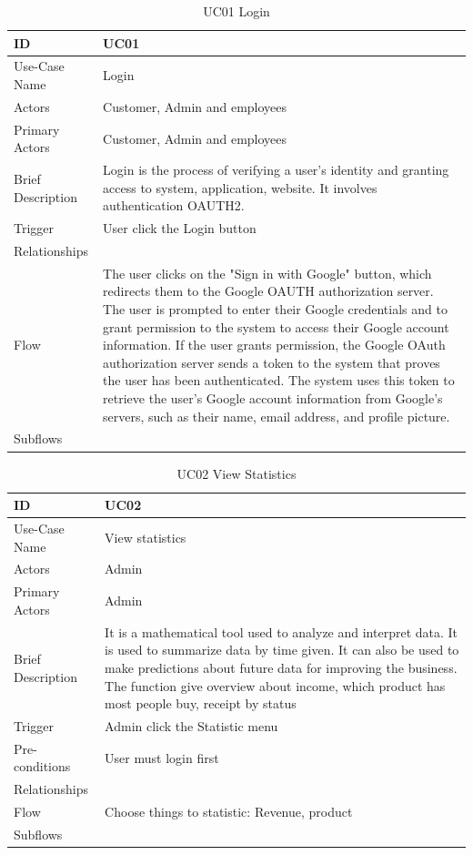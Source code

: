 \begin{table}
\begin{tabular}{|>{\raggedright\arraybackslash}p{5cm}|>{\raggedright\arraybackslash}p{10cm}|}
\hline
ID& UC01 \\
\hline
Use-Case Name& Login\\
\hline
Actors& Customer, Admin and employees\\
\hline
Primary Actors& Customer, Admin and employees\\
\hline
Brief Description& Login is the process of verifying a user's identity and granting access to system, application, website. It involves authentication OAUTH2.\\
\hline
Trigger& User click the Login button\\
\hline
Relationships& \\
\hline
Flow& The user clicks on the "Sign in with Google" button, which redirects them to the Google OAUTH authorization server.
The user is prompted to enter their Google credentials and to grant permission to the system to access their Google account information.
If the user grants permission, the Google OAuth authorization server sends a token to the system that proves the user has been authenticated.
The system uses this token to retrieve the user's Google account information from Google's servers, such as their name, email address, and profile picture.\\
\hline
Subflows&\\
\hline
\end{tabular}

\caption{UC01 Login}
\label{tab:UC01}
\end{table}
\begin{table}
\begin{tabular}{|>{\raggedright\arraybackslash}p{5cm}|>{\raggedright\arraybackslash}p{10cm}|}
\hline
ID& UC02\\
\hline
Use-Case Name& View statistics\\
\hline
Actors& Admin\\
\hline
Primary Actors& Admin \\
\hline
Brief Description& It is a mathematical tool used to analyze and interpret data. It is used to summarize data by time given. It can also be used to make predictions about future data for improving the business. The function give overview about income, which product has most people buy, receipt by status\\
\hline
Trigger& Admin click the Statistic menu\\
\hline
Pre-conditions& User must login first \\
\hline
Relationships& \\
\hline
Flow& Choose things to statistic: Revenue, product\\
\hline
Subflows& \\
\hline
\end{tabular}
\caption{UC02 View Statistics}
\label{tab:UC02}
\end{table}
